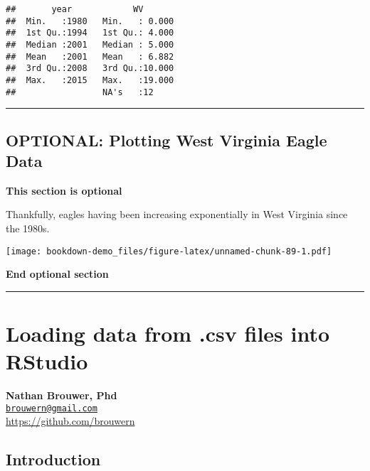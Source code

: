\documentclass[]{book}
\newenvironment{Shaded}{\begin{snugshade}}{\end{snugshade}}
\newcommand{\KeywordTok}[1]{\textcolor[rgb]{0.13,0.29,0.53}{\textbf{#1}}}
\newcommand{\DataTypeTok}[1]{\textcolor[rgb]{0.13,0.29,0.53}{#1}}
\newcommand{\DecValTok}[1]{\textcolor[rgb]{0.00,0.00,0.81}{#1}}
\newcommand{\OperatorTok}[1]{\textcolor[rgb]{0.81,0.36,0.00}{\textbf{#1}}}
\newcommand{\NormalTok}[1]{#1}
\theoremstyle{definition}
\theoremstyle{definition}
\theoremstyle{definition}
\theoremstyle{remark}
\begin{document}
\begin{verbatim}
##       year            WV        
##  Min.   :1980   Min.   : 0.000  
##  1st Qu.:1994   1st Qu.: 4.000  
##  Median :2001   Median : 5.000  
##  Mean   :2001   Mean   : 6.882  
##  3rd Qu.:2008   3rd Qu.:10.000  
##  Max.   :2015   Max.   :19.000  
##                 NA's   :12
\end{verbatim}

\begin{center}\rule{0.5\linewidth}{\linethickness}\end{center}

\section{OPTIONAL: Plotting West Virginia Eagle
Data}\label{optional-plotting-west-virginia-eagle-data}

\textbf{This section is optional}

Thankfully, eagles having been increasing exponentially in West Virginia
since the 1980s.

\begin{Shaded}
\end{Shaded}

\texttt{[image: bookdown-demo\_files/figure-latex/unnamed-chunk-89-1.pdf]}

\textbf{End optional section}

\begin{center}\rule{0.5\linewidth}{\linethickness}\end{center}

\chapter{Loading data from .csv files into
RStudio}\label{loading-data-from-.csv-files-into-rstudio}

\textbf{Nathan Brouwer, Phd}\\
\href{mailto:brouwern@gmail.com}{\nolinkurl{brouwern@gmail.com}}\\
\url{https://github.com/brouwern}\\
\citet{lobrowR}

\section{Introduction}\label{introduction-4}
\end{document}
